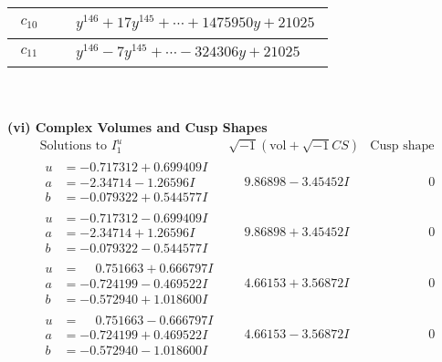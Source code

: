 \documentclass[1p]{elsarticle_modified}
\theoremstyle{definition}
\newcommand{\I}{\sqrt{-1}}
\begin{document}
\begin{tabular}{m{50pt}|m{274pt}}
\hline $$\begin{aligned}c_{10}\end{aligned}$$&$\begin{aligned}
&y^{146}+17 y^{145}+\cdots+1475950 y+21025
\end{aligned}$\\
\hline $$\begin{aligned}c_{11}\end{aligned}$$&$\begin{aligned}
&y^{146}-7 y^{145}+\cdots-324306 y+21025
\end{aligned}$\\
\hline
\end{tabular}\\~\\
\newpage\flushleft \textbf{(vi) Complex Volumes and Cusp Shapes}
$$\begin{array}{c|c|c}  
\text{Solutions to }I^u_{1}& \I (\text{vol} + \sqrt{-1}CS) & \text{Cusp shape}\\
 \hline 
\begin{aligned}
u &= -0.717312 + 0.699409 I \\
a &= -2.34714 - 1.26596 I \\
b &= -0.079322 + 0.544577 I\end{aligned}
 & \phantom{-}9.86898 - 3.45452 I & \phantom{-0.000000 } 0 \\ \hline\begin{aligned}
u &= -0.717312 - 0.699409 I \\
a &= -2.34714 + 1.26596 I \\
b &= -0.079322 - 0.544577 I\end{aligned}
 & \phantom{-}9.86898 + 3.45452 I & \phantom{-0.000000 } 0 \\ \hline\begin{aligned}
u &= \phantom{-}0.751663 + 0.666797 I \\
a &= -0.724199 - 0.469522 I \\
b &= -0.572940 + 1.018600 I\end{aligned}
 & \phantom{-}4.66153 + 3.56872 I & \phantom{-0.000000 } 0 \\ \hline\begin{aligned}
u &= \phantom{-}0.751663 - 0.666797 I \\
a &= -0.724199 + 0.469522 I \\
b &= -0.572940 - 1.018600 I\end{aligned}
 & \phantom{-}4.66153 - 3.56872 I & \phantom{-0.000000 } 0 \\ \hline\begin{aligned}

\end{aligned}
\end{array}$$
\end{document}
